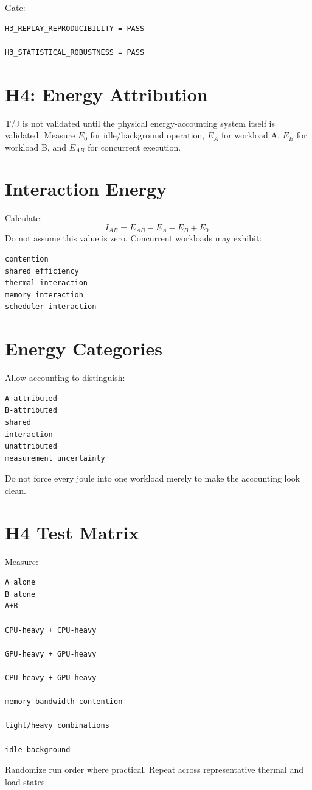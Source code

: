 \documentclass[11pt]{article}
\begin{document}
Gate:
\begin{verbatim}
H3_REPLAY_REPRODUCIBILITY = PASS

H3_STATISTICAL_ROBUSTNESS = PASS
\end{verbatim}

\section{H4: Energy Attribution}

T/J is not validated until the physical energy-accounting system itself is validated. Measure \(E_0\) for idle/background operation, \(E_A\) for workload A, \(E_B\) for workload B, and \(E_{AB}\) for concurrent execution.

\section{Interaction Energy}

Calculate:
\[
I_{AB}
=
E_{AB}-E_A-E_B+E_0.
\]
Do not assume this value is zero. Concurrent workloads may exhibit:
\begin{verbatim}
contention
shared efficiency
thermal interaction
memory interaction
scheduler interaction
\end{verbatim}

\section{Energy Categories}

Allow accounting to distinguish:
\begin{verbatim}
A-attributed
B-attributed
shared
interaction
unattributed
measurement uncertainty
\end{verbatim}
Do not force every joule into one workload merely to make the accounting look clean.

\section{H4 Test Matrix}

Measure:
\begin{verbatim}
A alone
B alone
A+B

CPU-heavy + CPU-heavy

GPU-heavy + GPU-heavy

CPU-heavy + GPU-heavy

memory-bandwidth contention

light/heavy combinations

idle background
\end{verbatim}
Randomize run order where practical. Repeat across representative thermal and load states.
\end{document}
